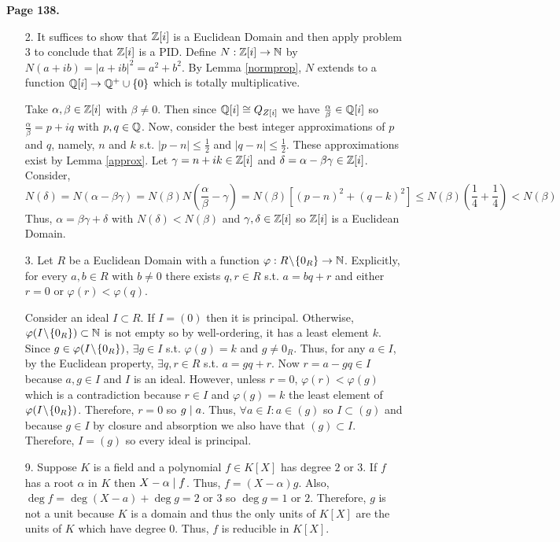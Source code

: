 \documentclass[12pt]{extarticle}
\begin{document}
\textbf{Page 138.} 
\begin{enumerate}
\item[2.] It suffices to show that $\mathbb{Z}[i]$ is a Euclidean Domain and then apply problem 3 to conclude that $\mathbb{Z}[i]$ is a PID. Define $N : \mathbb{Z}[i] \rightarrow \mathbb{N}$ by $N(a + ib) = |a+ib|^2 = a^2 + b^2$. By Lemma \ref{normprop}, $N$ extends to a function $\mathbb{Q}[i] \rightarrow \mathbb{Q}^+ \cup \{0 \}$ which is totally multiplicative.  


Take $\alpha, \beta \in \mathbb{Z}[i]$ with $\beta \neq 0$. Then since $\mathbb{Q}[i] \cong Q_{Z[i]}$ we have $\frac{\alpha}{\beta} \in \mathbb{Q}[i]$ so $\frac{\alpha}{\beta} = p + iq$ with $p, q \in \mathbb{Q}$. Now, consider the best integer approximations of $p$ and $q$, namely, $n$ and $k$ s.t. $|p - n| \le \frac{1}{2}$ and $|q - n| \le \frac{1}{2}$. These approximations exist by Lemma \ref{approx}. Let $\gamma = n + ik \in \mathbb{Z}[i]$ and $\delta = \alpha - \beta \gamma \in \mathbb{Z}[i]$. Consider,
\[N\left(\delta \right) = N(\alpha - \beta \gamma) = N(\beta) N\left(\frac{\alpha}{\beta} - \gamma \right) = N(\beta) \left[(p - n)^2 + (q - k)^2 \right] \le N(\beta) \left(\frac{1}{4} + \frac{1}{4} \right) < N(\beta) \] 
Thus, $\alpha = \beta \gamma + \delta$ with $N(\delta) < N(\beta)$ and $\gamma, \delta \in \mathbb{Z}[i]$ so $\mathbb{Z}[i]$ is a Euclidean Domain.

\item[3.] Let $R$ be a Euclidean Domain with a function $\varphi : R \! \setminus \! \{0_R\} \rightarrow \mathbb{N}$. Explicitly, for every $a, b \in R$ with $b \neq 0$ there exists $q, r \in R$ s.t. $a = bq + r$ and either $r = 0$ or $\varphi(r) < \varphi(q)$. \smallskip

Consider an ideal $I \subset R$. If $I = (0)$ then it is principal. Otherwise, $\varphi(I \! \setminus \! \{0_R\}) \subset \mathbb{N}$ is not empty so by well-ordering, it has a least element $k$. Since $g \in \varphi(I \! \setminus \! \{0_R\})$, $\exists g \in I$ s.t. $\varphi(g) = k$ and $g \neq 0_R$. Thus, for any $a \in I$, by the Euclidean property, $\exists q, r \in R$ s.t. $a = gq + r$. Now $r = a - gq \in I$ because $a, g \in I$ and $I$ is an ideal. However, unless $r = 0$, $\varphi(r) < \varphi(g)$ which is a contradiction because $r \in I$ and $\varphi(g) = k$ the least element of $\varphi(I \! \setminus \! \{0_R\})$. Therefore, $r = 0$ so $g \mid a$. Thus, $\forall a \in I : a \in (g)$ so $I \subset (g)$ and because $g \in I$ by closure and absorption we also have that $(g) \subset I$. Therefore, $I = (g)$ so every ideal is principal.  

\item[9.] Suppose $K$ is a field and a polynomial $f \in K[X]$ has degree $2$ or $3$.
If $f$ has a root $\alpha$ in $K$ then $X - \alpha \mid f$. Thus, $f = (X - \alpha) g$. Also, $\deg{f} = \deg{\left(X-a\right)} + \deg{g} = 2$ or $3$ so $\deg g = 1$ or $2$. Therefore, $g$ is not a unit because $K$ is a domain and thus the only units of $K[X]$ are the units of $K$ which have degree $0$. Thus, $f$ is reducible in $K[X]$. \smallskip


\end{enumerate}
\end{document}
